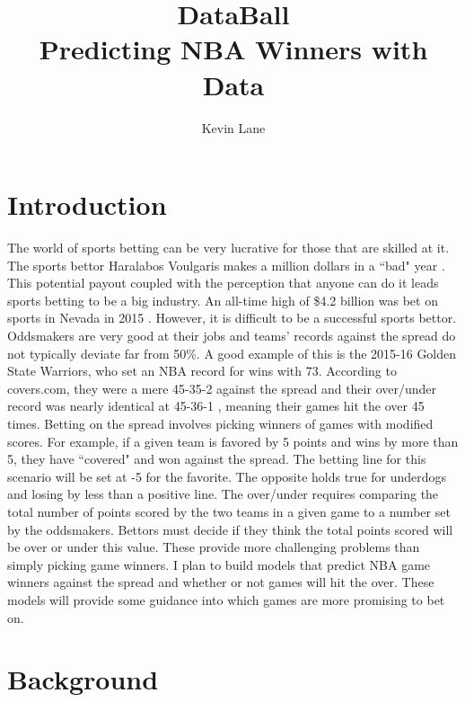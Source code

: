 \documentclass{article}
\title{DataBall \\ Predicting NBA Winners with Data}
\author{Kevin Lane}
\begin{document}
\maketitle

\section{Introduction}

The world of sports betting can be very lucrative for those that are skilled at it. The sports bettor Haralabos Voulgaris makes a million dollars in a ``bad" year \cite{silver}. This potential payout coupled with the perception that anyone can do it leads sports betting to be a big industry. An all-time high of \$4.2 billion was bet on sports in Nevada in 2015 \cite{espn}. However, it is difficult to be a successful sports bettor. Oddsmakers are very good at their jobs and teams' records against the spread do not typically deviate far from 50\%. A good example of this is the 2015-16 Golden State Warriors, who set an NBA record for wins with 73. According to covers.com, they were a mere 45-35-2 against the spread and their over/under record was nearly identical at 45-36-1 \cite{covers}, meaning their games hit the over 45 times. Betting on the spread involves picking winners of games with modified scores. For example, if a given team is favored by 5 points and wins by more than 5, they have ``covered" and won against the spread. The betting line for this scenario will be set at -5 for the favorite. The opposite holds true for underdogs and losing by less than a positive line. The over/under requires comparing the total number of points scored by the two teams in a given game to a number set by the oddsmakers. Bettors must decide if they think the total points scored will be over or under this value. These provide more challenging problems than simply picking game winners. I plan to build models that predict NBA game winners against the spread and whether or not games will hit the over. These models will provide some guidance into which games are more promising to bet on.

\section{Background}
\end{document}
